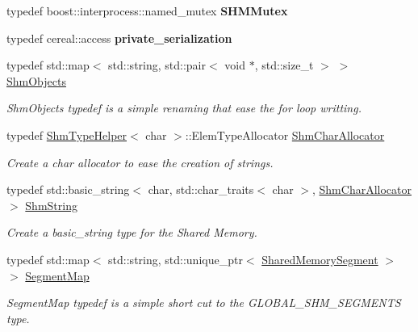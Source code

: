 \begin{DoxyCompactItemize}
\mbox{\label{namespaceshared__memory_a9e455ab41b63e529ceca7424dbf13ba1}} 
typedef boost\+::interprocess\+::named\+\_\+mutex {\bfseries S\+H\+M\+Mutex}
\item 
\mbox{\label{namespaceshared__memory_ada3eeebd8f77a3757ad50c9401bcd249}} 
typedef cereal\+::access {\bfseries private\+\_\+serialization}
\item 
\mbox{\label{namespaceshared__memory_ae50b2192256821112a69e47d5314b467}} 
typedef std\+::map$<$ std\+::string, std\+::pair$<$ void $\ast$, std\+::size\+\_\+t $>$ $>$ \hyperlink{namespaceshared__memory_ae50b2192256821112a69e47d5314b467}{Shm\+Objects}
\begin{DoxyCompactList}\small\item\em Shm\+Objects typedef is a simple renaming that ease the for loop writting. \end{DoxyCompactList}\item 
\mbox{\label{namespaceshared__memory_a36a105df63154c883e86f4282f380647}} 
typedef \hyperlink{structshared__memory_1_1ShmTypeHelper}{Shm\+Type\+Helper}$<$ char $>$\+::Elem\+Type\+Allocator \hyperlink{namespaceshared__memory_a36a105df63154c883e86f4282f380647}{Shm\+Char\+Allocator}
\begin{DoxyCompactList}\small\item\em Create a char allocator to ease the creation of strings. \end{DoxyCompactList}\item 
\mbox{\label{namespaceshared__memory_a07ee51d077030d33ba8408f5938569cc}} 
typedef std\+::basic\+\_\+string$<$ char, std\+::char\+\_\+traits$<$ char $>$, \hyperlink{namespaceshared__memory_a36a105df63154c883e86f4282f380647}{Shm\+Char\+Allocator} $>$ \hyperlink{namespaceshared__memory_a07ee51d077030d33ba8408f5938569cc}{Shm\+String}
\begin{DoxyCompactList}\small\item\em Create a basic\+\_\+string type for the Shared Memory. \end{DoxyCompactList}\item 
\mbox{\label{namespaceshared__memory_a9aeebdfb6185497cac7c093cf3d765c5}} 
typedef std\+::map$<$ std\+::string, std\+::unique\+\_\+ptr$<$ \hyperlink{classshared__memory_1_1SharedMemorySegment}{Shared\+Memory\+Segment} $>$ $>$ \hyperlink{namespaceshared__memory_a9aeebdfb6185497cac7c093cf3d765c5}{Segment\+Map}
\begin{DoxyCompactList}\small\item\em Segment\+Map typedef is a simple short cut to the G\+L\+O\+B\+A\+L\+\_\+\+S\+H\+M\+\_\+\+S\+E\+G\+M\+E\+N\+TS type. \end{DoxyCompactList}\end{DoxyCompactItemize}
